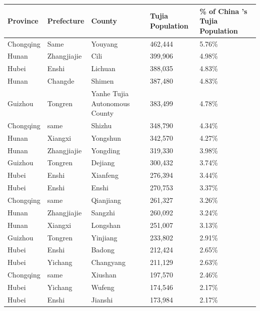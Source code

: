 \documentclass{article}
\begin{document}
\begin{tabular}{lllll}
\toprule
Province & Prefecture & County & Tujia Population & \% of China 's Tujia Population \\
\midrule
Chongqing & Same & Youyang & 462,444 & 5.76\% \\
Hunan & Zhangjiajie & Cili & 399,906 & 4.98\% \\
Hubei & Enshi & Lichuan & 388,035 & 4.83\% \\
Hunan & Changde & Shimen & 387,480 & 4.83\% \\
Guizhou & Tongren & Yanhe Tujia Autonomous County & 383,499 & 4.78\% \\
Chongqing & same & Shizhu & 348,790 & 4.34\% \\
Hunan & Xiangxi & Yongshun & 342,570 & 4.27\% \\
Hunan & Zhangjiajie & Yongding & 319,330 & 3.98\% \\
Guizhou & Tongren & Dejiang & 300,432 & 3.74\% \\
Hubei & Enshi & Xianfeng & 276,394 & 3.44\% \\
Hubei & Enshi & Enshi & 270,753 & 3.37\% \\
Chongqing & same & Qianjiang & 261,327 & 3.26\% \\
Hunan & Zhangjiajie & Sangzhi & 260,092 & 3.24\% \\
Hunan & Xiangxi & Longshan & 251,007 & 3.13\% \\
Guizhou & Tongren & Yinjiang & 233,802 & 2.91\% \\
Hubei & Enshi & Badong & 212,424 & 2.65\% \\
Hubei & Yichang & Changyang & 211,129 & 2.63\% \\
Chongqing & same & Xiushan & 197,570 & 2.46\% \\
Hubei & Yichang & Wufeng & 174,546 & 2.17\% \\
Hubei & Enshi & Jianshi & 173,984 & 2.17\% \\
\bottomrule
\end{tabular}
\end{document}
